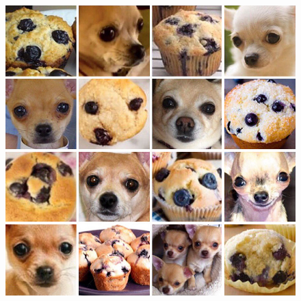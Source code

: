 \documentclass[a4paper, oneside]{discothesis}
\begin{document}
\begin{figure}[th]
	\hfill
	\begin{minipage}[t]{0.24\textwidth}\centering\includegraphics[width=\textwidth]{figures/dog-vs-muffin.jpeg}\end{minipage}
	
	\vspace{1em}


\end{figure}
\end{document}

